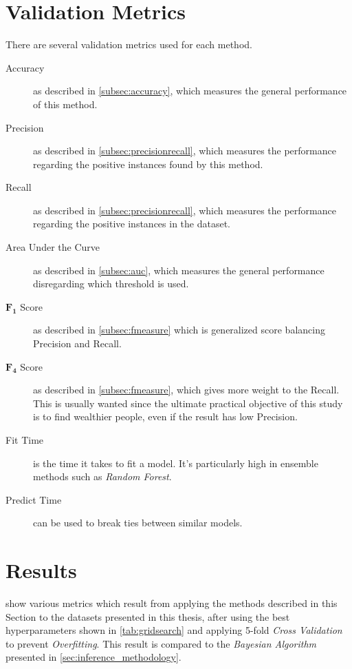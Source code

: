 \section{Validation Metrics}
\label{subsec:validationmetrics}
There are several validation metrics used for each method.

\begin{description}
	\item[Accuracy] as described in \cref{subsec:accuracy}, which measures the general performance of this method.
	\item[Precision] as described in \cref{subsec:precisionrecall}, which measures the performance regarding the positive instances found by this method.
	\item[Recall] as described in \cref{subsec:precisionrecall}, which measures the performance regarding the positive instances in the dataset.
	\item[Area Under the Curve] as described in \cref{subsec:auc}, which measures the general performance disregarding which threshold is used.
	\item[$\mathbf{F_1}$ Score] as described in \cref{subsec:fmeasure} which is generalized score balancing Precision and Recall.
	\item[$\mathbf{F_4}$ Score] as described in \cref{subsec:fmeasure}, which gives more weight to the Recall. This is usually wanted since the ultimate practical objective of this study is to find wealthier people, even if the result has low Precision.
	\item[Fit Time] is the time it takes to fit a model. It's particularly high in ensemble methods such as \emph{Random Forest}.
	\item[Predict Time] can be used to break ties between similar models.
\end{description}

\section{Results}
\label{sec:comparison_results}

 show various metrics which result from applying the methods described in this Section to the datasets presented in this thesis, after using the best hyperparameters shown in \cref{tab:gridsearch} and applying 5-fold \emph{Cross Validation} to prevent \emph{Overfitting}. This result is compared to the \emph{Bayesian Algorithm} presented in \cref{sec:inference_methodology}.


